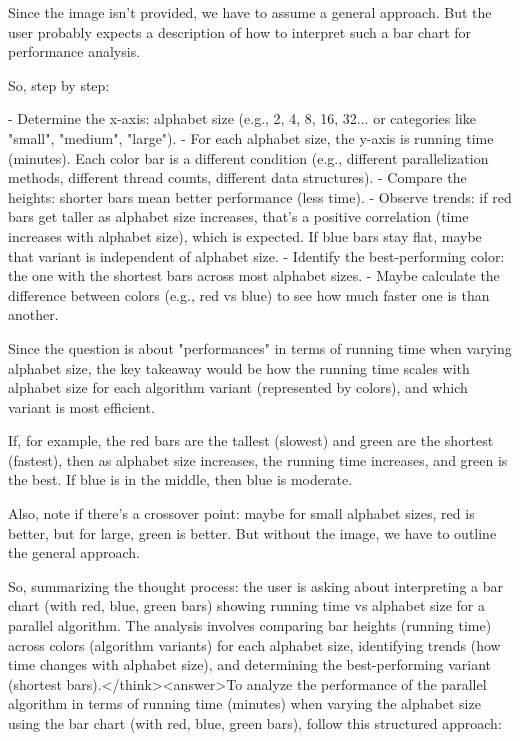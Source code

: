 Since the image isn't provided, we have to assume a general approach. But the user probably expects a description of how to interpret such a bar chart for performance analysis. 

So, step by step:

- Determine the x-axis: alphabet size (e.g., 2, 4, 8, 16, 32... or categories like "small", "medium", "large").
- For each alphabet size, the y-axis is running time (minutes). Each color bar is a different condition (e.g., different parallelization methods, different thread counts, different data structures).
- Compare the heights: shorter bars mean better performance (less time).
- Observe trends: if red bars get taller as alphabet size increases, that's a positive correlation (time increases with alphabet size), which is expected. If blue bars stay flat, maybe that variant is independent of alphabet size.
- Identify the best-performing color: the one with the shortest bars across most alphabet sizes.
- Maybe calculate the difference between colors (e.g., red vs blue) to see how much faster one is than another.

Since the question is about "performances" in terms of running time when varying alphabet size, the key takeaway would be how the running time scales with alphabet size for each algorithm variant (represented by colors), and which variant is most efficient. 

If, for example, the red bars are the tallest (slowest) and green are the shortest (fastest), then as alphabet size increases, the running time increases, and green is the best. If blue is in the middle, then blue is moderate. 

Also, note if there's a crossover point: maybe for small alphabet sizes, red is better, but for large, green is better. But without the image, we have to outline the general approach. 

So, summarizing the thought process: the user is asking about interpreting a bar chart (with red, blue, green bars) showing running time vs alphabet size for a parallel algorithm. The analysis involves comparing bar heights (running time) across colors (algorithm variants) for each alphabet size, identifying trends (how time changes with alphabet size), and determining the best-performing variant (shortest bars).</think><answer>To analyze the performance of the parallel algorithm in terms of running time (minutes) when varying the alphabet size using the bar chart (with red, blue, green bars), follow this structured approach:  


